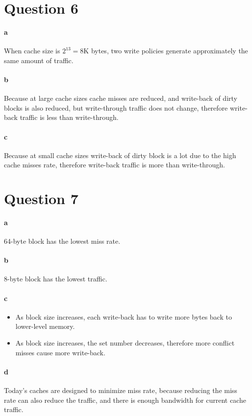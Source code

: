 \documentclass[12pt,letterpaper]{article}
\begin{document}
\section*{Question 6}
\paragraph*{a}
When cache size is $2^{13}=8$K bytes, two write policies generate approximately the same
amount of traffic.
\paragraph*{b}
Because at large cache sizes cache misses are reduced, and write-back of dirty blocks is also
reduced, but write-through traffic does not change, therefore write-back traffic is less than
write-through.
\paragraph*{c}
Because at small cache sizes write-back of dirty block is a lot due to the high cache misses
rate, therefore write-back traffic is more than write-through.
\section*{Question 7}
\paragraph*{a}
64-byte block has the lowest miss rate.
\paragraph*{b}
8-byte block has the lowest traffic.
\paragraph*{c}
\begin{itemize}
    \item As block size increases, each write-back has to write more bytes back to lower-level
    memory.
    \item As block size increases, the set number decreases, therefore more conflict misses
    cause more write-back.
\end{itemize}
\paragraph*{d}
Today's caches are designed to minimize miss rate, because reducing the miss rate can also
reduce the traffic, and there is enough bandwidth for current cache traffic.
\end{document}
